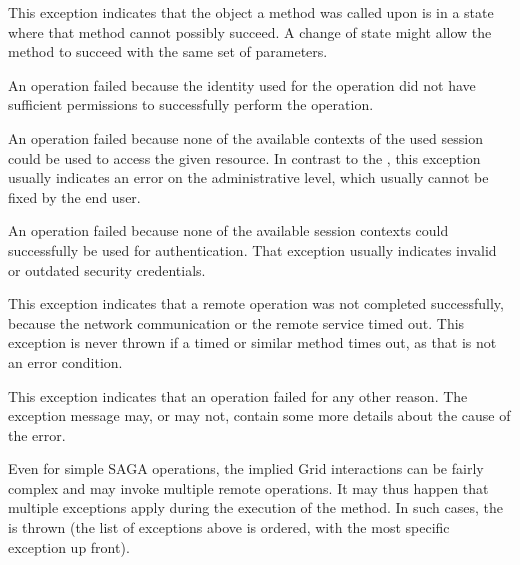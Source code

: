 \begin{description}
  \item{}

   This exception indicates that the object a method was called
   upon is in a state where that method cannot possibly succeed.
   A change of state might allow the method to succeed with the
   same set of parameters.


  \item{}

   An operation failed because the identity used for the
   operation did not have sufficient permissions to successfully
   perform the operation.
   

  \item{}

   An operation failed because none of the available contexts of
   the used session could be used to access the given resource.
   In contrast to the , this exception
   usually indicates an error on the administrative level, which
   usually cannot be fixed by the end user.


  \item{}
  
   An operation failed because none of the available session
   contexts could successfully be used for authentication.  That
   exception usually indicates invalid or outdated security
   credentials.


  \item{}

   This exception indicates that a remote operation was not
   completed successfully, because the network communication or
   the remote service timed out.  This exception is never thrown
   if a timed  or similar method times out, as that is
   not an error condition.


  \item{}

   This exception indicates that an operation failed for any
   other reason.  The exception message may, or may not, contain
   some more details about the cause of the error.

 \end{description}

 Even for simple SAGA operations, the implied Grid interactions
 can be fairly complex and may invoke multiple remote
 operations.  It may thus happen that multiple exceptions apply
 during the execution of the method.  In such cases, the  is thrown (the list of exceptions above is
 ordered, with the most specific exception up front).  
 
